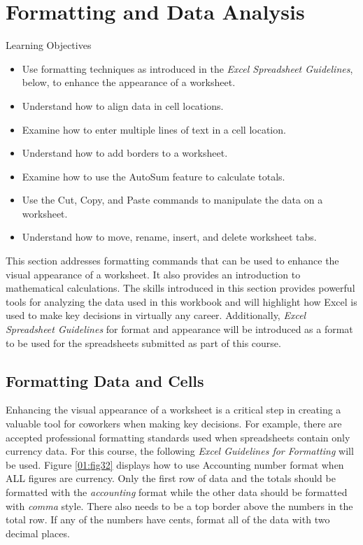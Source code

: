 \section{Formatting and Data Analysis}

\begin{center}
	\begin{objbox}{Learning Objectives}
		\begin{itemize}
			\setlength{\itemsep}{0pt}
			\setlength{\parskip}{0pt}
			\setlength{\parsep}{0pt}
			
			\item Use formatting techniques as introduced in the \textit{Excel Spreadsheet Guidelines}, below, to enhance the appearance of a worksheet.
			\item Understand how to align data in cell locations.
			\item Examine how to enter multiple lines of text in a cell location.
			\item Understand how to add borders to a worksheet.
			\item Examine how to use the AutoSum feature to calculate totals.
			\item Use the Cut, Copy, and Paste commands to manipulate the data on a worksheet.
			\item Understand how to move, rename, insert, and delete worksheet tabs.
		\end{itemize}
	\end{objbox}
\end{center}

This section addresses formatting commands that can be used to enhance the visual appearance of a worksheet. It also provides an introduction to mathematical calculations. The skills introduced in this section provides powerful tools for analyzing the data used in this workbook and will highlight how Excel is used to make key decisions in virtually any career. Additionally, \textit{Excel Spreadsheet Guidelines} for format and appearance will be introduced as a format to be used for the spreadsheets submitted as part of this course.

\subsection{Formatting Data and Cells}

Enhancing the visual appearance of a worksheet is a critical step in creating a valuable tool for coworkers when making key decisions. For example, there are accepted professional formatting standards used when spreadsheets contain only currency data. For this course, the following \textit{Excel Guidelines for Formatting} will be used. Figure \ref{01:fig32} displays how to use Accounting number format when ALL figures are currency. Only the first row of data and the totals should be formatted with the \textit{accounting} format while the other data should be formatted with \textit{comma} style. There also needs to be a top border above the numbers in the total row. If any of the numbers have cents, format all of the data with two decimal places.

